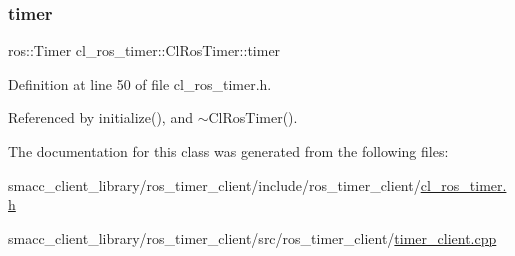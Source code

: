 \mbox{\label{classcl__ros__timer_1_1ClRosTimer_a50237ecbf49b178b9d109b25ba768f5a}} 
\subsubsection{\texorpdfstring{timer}{timer}}
{\footnotesize\ttfamily ros\+::\+Timer cl\+\_\+ros\+\_\+timer\+::\+Cl\+Ros\+Timer\+::timer\hspace{0.3cm}{\ttfamily [protected]}}



Definition at line 50 of file cl\+\_\+ros\+\_\+timer.\+h.



Referenced by initialize(), and $\sim$\+Cl\+Ros\+Timer().



The documentation for this class was generated from the following files\+:\begin{DoxyCompactItemize}
\item 
smacc\+\_\+client\+\_\+library/ros\+\_\+timer\+\_\+client/include/ros\+\_\+timer\+\_\+client/\hyperlink{cl__ros__timer_8h}{cl\+\_\+ros\+\_\+timer.\+h}\item 
smacc\+\_\+client\+\_\+library/ros\+\_\+timer\+\_\+client/src/ros\+\_\+timer\+\_\+client/\hyperlink{timer__client_8cpp}{timer\+\_\+client.\+cpp}\end{DoxyCompactItemize}
